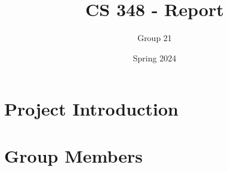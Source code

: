 \documentclass{article}
\title{CS 348 - Report}
\author{Group 21}
\date{Spring 2024}
\begin{document}
\maketitle

\section{Project Introduction}

\section{Group Members}
\end{document}
